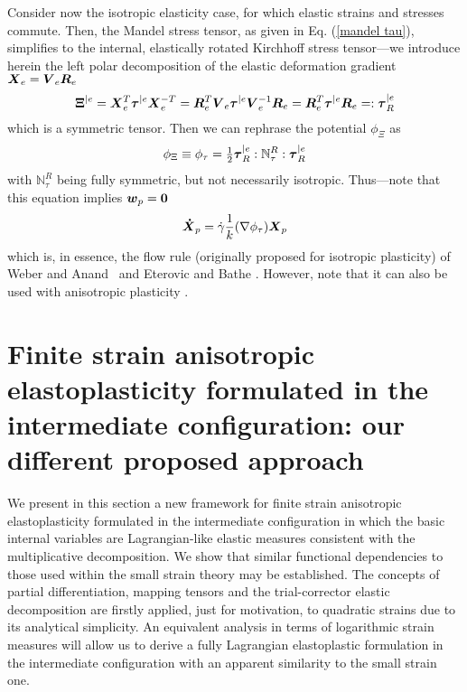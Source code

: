 \documentclass[preprint,review,12pt,sort&compress]{elsarticle}%
\renewcommand{\mathbf}[1]{\mbox{\boldmath $#1$ \unboldmath}  \!\!}
\begin{document}
Consider now the isotropic elasticity case, for which elastic strains and
stresses commute. Then, the Mandel stress tensor, as given in Eq.
(\ref{mandel tau}), simplifies to the internal, elastically rotated Kirchhoff
stress tensor---we introduce herein the left polar decomposition of the
elastic deformation gradient $\mathbf{X}_{e}=\mathbf{V}_{e}\mathbf{R}_{e}$%
\begin{equation}
\mathbf{\Xi}^{|e}=\mathbf{X}_{e}^{T}\mathbf{\tau}^{|e}\mathbf{X}_{e}%
^{-T}=\mathbf{R}_{e}^{T}\mathbf{V}_{e}\mathbf{\tau}^{|e}\mathbf{V}_{e}%
^{-1}\mathbf{R}_{e}=\mathbf{R}_{e}^{T}\mathbf{\tau}^{|e}\mathbf{R}%
_{e}=:\mathbf{\tau}_{R}^{|e} \label{rotated kirchhoff stresses}%
\end{equation}
which is a symmetric tensor. Then we can rephrase the potential $\phi_{\Xi}$
as%
\begin{equation}
\phi_{\Xi}\equiv\phi_{\tau}=\tfrac{1}{2}\mathbf{\tau}_{R}^{|e}:\mathbb{N}%
_{\tau}^{R}:\mathbf{\tau}_{R}^{|e}%
\end{equation}
with $\mathbb{N}_{\tau}^{R}$ being fully symmetric, but not necessarily
isotropic. Thus---note that this equation implies $\mathbf{w}_{p}=\mathbf{0}$%
\begin{equation}
\mathbf{\dot{X}}_{p}=\dot{\gamma}\frac{1}{k}(\nabla\phi_{\tau})\mathbf{X}_{p}%
\end{equation}
which is, in essence, the flow rule (originally proposed for isotropic
plasticity) of Weber and Anand \cite{WeberAnand90}\ and Eterovic and Bathe
\cite{EterovicBathe90}. However, note that it can also be used with
anisotropic plasticity \cite{MontansBathe05}.

\section{Finite strain anisotropic elastoplasticity formulated in the
intermediate configuration: our different proposed approach}

We present in this section a new framework for finite strain anisotropic
elastoplasticity formulated in the intermediate configuration in which the
basic internal variables are Lagrangian-like elastic measures consistent with
the multiplicative decomposition. We show that similar functional dependencies
to those used within the small strain theory may be established. The concepts
of partial differentiation, mapping tensors and the trial-corrector elastic
decomposition are firstly applied, just for motivation, to quadratic strains
due to its analytical simplicity. An equivalent analysis in terms of
logarithmic strain measures will allow us to derive a fully Lagrangian
elastoplastic formulation in the intermediate configuration with an apparent
similarity to the small strain one.
\end{document}
